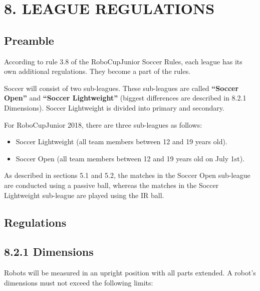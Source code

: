 \documentclass{article}
\begin{document}
\section{8. LEAGUE REGULATIONS \label{ref-052}}

\subsection{ Preamble \label{ref-053}}

According to rule 3.8 of the RoboCupJunior Soccer Rules, each league has its own additional regulations. They become a part of the rules.

Soccer will consist of two sub-leagues. These sub-leagues are called \textbf{``}\textbf{Soccer Open}\textbf{''} and \textbf{``}\textbf{Soccer Lightweight}\textbf{''} (biggest differences are described in 8.2.1 Dimensions). Soccer Lightweight is divided into primary and secondary.

For RoboCupJunior 2018, there are three sub-leagues as follows:

\begin{itemize}

\item Soccer Lightweight (all team members between 12 and 19 years old).

\item Soccer Open (all team members between 12 and 19 years old on July 1st).

\end{itemize}
As described in sections 5.1 and 5.2, the matches in the Soccer Open sub-league are conducted using a passive ball, whereas the matches in the Soccer Lightweight sub-league are played using the IR ball.

\subsection{ Regulations \label{ref-054}}

\subsection{8.2.1 Dimensions \label{ref-055}}

Robots will be measured in an upright position with all parts extended. A robot's dimensions must not exceed the following limits:
\end{document}
